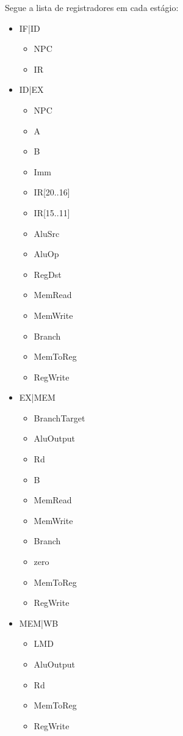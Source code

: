 \documentclass[a4paper]{article}
\begin{document}
Segue  a lista de registradores em cada estágio:
\begin{itemize}
    \item IF|ID
        \begin{itemize}
            \item NPC
            \item IR
        \end{itemize}
    \item ID|EX
        \begin{itemize}
            \item NPC
            \item A
            \item B
            \item Imm
            \item IR[20..16]
            \item IR[15..11]
            \item AluSrc
            \item AluOp
            \item RegDst
            \item MemRead
            \item MemWrite
            \item Branch
            \item MemToReg
            \item RegWrite
        \end{itemize}
    \item EX|MEM
        \begin{itemize}
            \item BranchTarget
            \item AluOutput
            \item Rd
            \item B
            \item MemRead
            \item MemWrite
            \item Branch
            \item zero
            \item MemToReg
            \item RegWrite
        \end{itemize}
    \item MEM|WB
        \begin{itemize}
            \item LMD
            \item AluOutput
            \item Rd
            \item MemToReg
            \item RegWrite
        \end{itemize}
\end{itemize}
\end{document}
